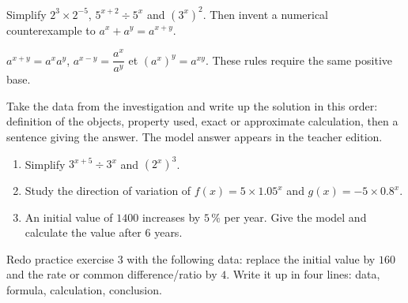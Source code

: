 \begin{activite}
Simplify $2^3\times2^{-5}$, $5^{x+2}\div5^x$ and $(3^x)^2$. Then invent a numerical counterexample to $a^x+a^y=a^{x+y}$.

\end{activite}

\begin{traceecrite}$a^{x+y}=a^xa^y$, $a^{x-y}=\dfrac{a^x}{a^y}$ et $(a^x)^y=a^{xy}$. These rules require the same positive base.\end{traceecrite}

\begin{exemple}
Take the data from the investigation and write up the solution in this order: definition of the objects, property used, exact or approximate calculation, then a sentence giving the answer. The model answer appears in the teacher edition.
\end{exemple}

\begin{exercice}[-- essential]
\begin{enumerate}\item Simplify $3^{x+5}\div3^x$ and $(2^x)^3$.\item Study the direction of variation of $f(x)=5\times1.05^x$ and $g(x)=-5\times0.8^x$.\item An initial value of $1400$ increases by $5\,\%$ per year. Give the model and calculate the value after $6$ years.\end{enumerate}
\end{exercice}


\begin{dm}Redo practice exercise 3 with the following data: replace the initial value by $160$ and the rate or common difference/ratio by $4$. Write it up in four lines: data, formula, calculation, conclusion.\end{dm}

